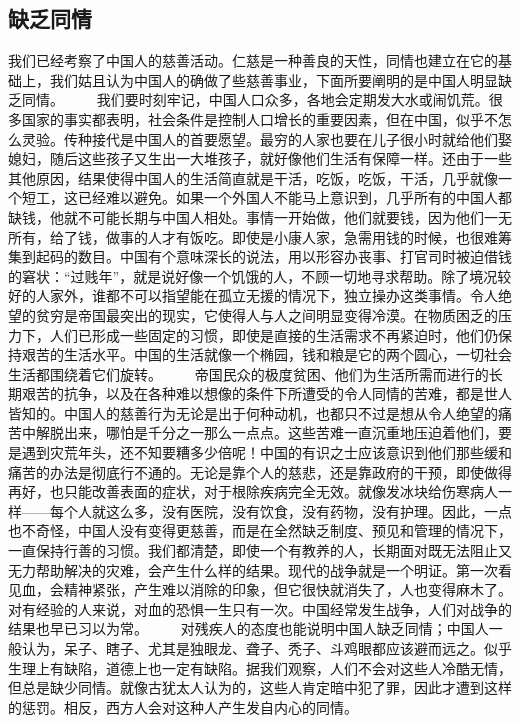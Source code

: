 \documentclass[12pt,oneside]{book}
\begin{document}
\begin{common-format}
\chapter{缺乏同情}
我们已经考察了中国人的慈善活动。仁慈是一种善良的天性，同情也建立在它的基础上，我们姑且认为中国人的确做了些慈善事业，下面所要阐明的是中国人明显缺乏同情。 
　　我们要时刻牢记，中国人口众多，各地会定期发大水或闹饥荒。很多国家的事实都表明，社会条件是控制人口增长的重要因素，但在中国，似乎不怎么灵验。传种接代是中国人的首要愿望。最穷的人家也要在儿子很小时就给他们娶媳妇，随后这些孩子又生出一大堆孩子，就好像他们生活有保障一样。还由于一些其他原因，结果使得中国人的生活简直就是干活，吃饭，吃饭，干活，几乎就像一个短工，这已经难以避免。如果一个外国人不能马上意识到，几乎所有的中国人都缺钱，他就不可能长期与中国人相处。事情一开始做，他们就要钱，因为他们一无所有，给了钱，做事的人才有饭吃。即使是小康人家，急需用钱的时候，也很难筹集到起码的数目。中国有个意味深长的说法，用以形容办丧事、打官司时被迫借钱的窘状：“过贱年”，就是说好像一个饥饿的人，不顾一切地寻求帮助。除了境况较好的人家外，谁都不可以指望能在孤立无援的情况下，独立操办这类事情。令人绝望的贫穷是帝国最突出的现实，它使得人与人之间明显变得冷漠。在物质困乏的压力下，人们已形成一些固定的习惯，即使是直接的生活需求不再紧迫时，他们仍保持艰苦的生活水平。中国的生活就像一个椭园，钱和粮是它的两个圆心，一切社会生活都围绕着它们旋转。 
　　帝国民众的极度贫困、他们为生活所需而进行的长期艰苦的抗争，以及在各种难以想像的条件下所遭受的令人同情的苦难，都是世人皆知的。中国人的慈善行为无论是出于何种动机，也都只不过是想从令人绝望的痛苦中解脱出来，哪怕是千分之一那么一点点。这些苦难一直沉重地压迫着他们，要是遇到灾荒年头，还不知要糟多少倍呢！中国的有识之士应该意识到他们那些缓和痛苦的办法是彻底行不通的。无论是靠个人的慈悲，还是靠政府的干预，即使做得再好，也只能改善表面的症状，对于根除疾病完全无效。就像发冰块给伤寒病人一样——每个人就这么多，没有医院，没有饮食，没有药物，没有护理。因此，一点也不奇怪，中国人没有变得更慈善，而是在全然缺乏制度、预见和管理的情况下，一直保持行善的习惯。我们都清楚，即使一个有教养的人，长期面对既无法阻止又无力帮助解决的灾难，会产生什么样的结果。现代的战争就是一个明证。第一次看见血，会精神紧张，产生难以消除的印象，但它很快就消失了，人也变得麻木了。对有经验的人来说，对血的恐惧一生只有一次。中国经常发生战争，人们对战争的结果也早已习以为常。 
　　对残疾人的态度也能说明中国人缺乏同情；中国人一般认为，呆子、瞎子、尤其是独眼龙、聋子、秃子、斗鸡眼都应该避而远之。似乎生理上有缺陷，道德上也一定有缺陷。据我们观察，人们不会对这些人冷酷无情，但总是缺少同情。就像古犹太人认为的，这些人肯定暗中犯了罪，因此才遭到这样的惩罚。相反，西方人会对这种人产生发自内心的同情。 

\end{common-format}
\end{document}

